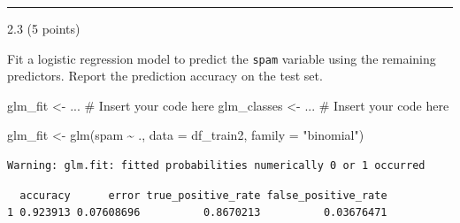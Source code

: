\documentclass[
  letterpaper,
  DIV=11,
  numbers=noendperiod]{scrartcl}
\newenvironment{Shaded}{\begin{snugshade}}{\end{snugshade}}
\newcommand{\AttributeTok}[1]{\textcolor[rgb]{0.40,0.45,0.13}{#1}}
\newcommand{\CommentTok}[1]{\textcolor[rgb]{0.37,0.37,0.37}{#1}}
\newcommand{\DecValTok}[1]{\textcolor[rgb]{0.68,0.00,0.00}{#1}}
\newcommand{\FloatTok}[1]{\textcolor[rgb]{0.68,0.00,0.00}{#1}}
\newcommand{\FunctionTok}[1]{\textcolor[rgb]{0.28,0.35,0.67}{#1}}
\newcommand{\NormalTok}[1]{\textcolor[rgb]{0.00,0.23,0.31}{#1}}
\newcommand{\OtherTok}[1]{\textcolor[rgb]{0.00,0.23,0.31}{#1}}
\newcommand{\SpecialCharTok}[1]{\textcolor[rgb]{0.37,0.37,0.37}{#1}}
\newcommand{\StringTok}[1]{\textcolor[rgb]{0.13,0.47,0.30}{#1}}
\begin{document}
\begin{center}\rule{0.5\linewidth}{0.5pt}\end{center}

2.3 (5 points)

Fit a logistic regression model to predict the \texttt{spam} variable
using the remaining predictors. Report the prediction accuracy on the
test set.

\begin{Shaded}
\begin{Highlighting}[]
\NormalTok{glm\_fit }\OtherTok{\textless{}{-}}\NormalTok{ ... }\CommentTok{\# Insert your code here}
\NormalTok{glm\_classes }\OtherTok{\textless{}{-}}\NormalTok{ ... }\CommentTok{\# Insert your code here}
\end{Highlighting}
\end{Shaded}

\begin{Shaded}
\begin{Highlighting}[]
\NormalTok{glm\_fit }\OtherTok{\textless{}{-}} \FunctionTok{glm}\NormalTok{(spam }\SpecialCharTok{\textasciitilde{}}\NormalTok{ ., }\AttributeTok{data =}\NormalTok{ df\_train2, }\AttributeTok{family =} \StringTok{"binomial"}\NormalTok{)}
\end{Highlighting}
\end{Shaded}

\begin{verbatim}
Warning: glm.fit: fitted probabilities numerically 0 or 1 occurred
\end{verbatim}

\begin{Shaded}
\end{Shaded}

\begin{verbatim}
  accuracy      error true_positive_rate false_positive_rate
1 0.923913 0.07608696          0.8670213          0.03676471
\end{verbatim}
\end{document}
